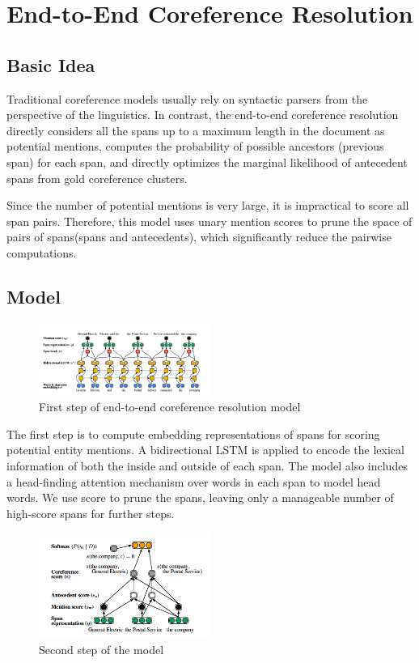 \documentclass[11pt]{article}
\begin{document}
\section{End-to-End Coreference Resolution}

\subsection{Basic Idea}
Traditional coreference models usually rely on syntactic parsers from the perspective of the linguistics. In contrast, the end-to-end coreference resolution directly considers all the spans up to a maximum length in the document as potential mentions,  computes the probability of possible ancestors (previous span) for each span, and directly optimizes the marginal likelihood of antecedent spans from gold coreference clusters.

Since the number of potential mentions is very large, it is impractical to score all span pairs. Therefore, this model uses unary mention scores to prune the space of pairs of spans(spans and antecedents), which significantly reduce the pairwise computations.

\subsection{Model}

\begin{figure}[h]
                
 \includegraphics[width=0.5\textwidth]{02.jpg}
 \caption{First step of end-to-end coreference resolution model}
                
\end{figure}

The first step is to compute embedding representations of spans for scoring potential entity mentions.
A  bidirectional LSTM is applied to encode the lexical information of both the inside and outside of each span. The model also includes a head-finding attention mechanism over words in each span to model head words.
We use score to prune the spans, leaving only a manageable number of high-score spans for further steps.

\begin{figure}[h]                
 \includegraphics[width=0.5\textwidth]{03.jpg}
 \caption{Second step of the model}             
\end{figure}
\end{document}
